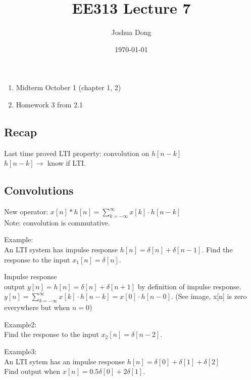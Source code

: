 \documentclass{article}
\begin{document}
\title{EE313\: Lecture 7}
\author{Joshua Dong}
\date{\today}
\maketitle

\begin{enumerate}
    \item{Midterm October 1 (chapter 1, 2)}
    \item{Homework 3 from 2.1}
\end{enumerate}

\subsection{Recap}
Last time proved LTI property: convolution on $h[n-k]$
\\$h[n-k] \rightarrow$ know if LTI.

\subsection{Convolutions}
New operator:
$x[n] * h[n] = \sum\limits_{k = -\infty}^\infty x[k] \cdot h[n-k]$
\\Note: convolution is commutative.
\begin{description}
    \item{Example:} \hfill \\
        An LTI system has impulse response
        $h[n] = \delta[n] + \delta[n-1]$.
        Find the response to the input $x_1[n] = \delta[n]$.
    \item{Impulse response} \hfill \\
        output $y[n] = h[n] = \delta[n] + \delta[n+1]$ by definition of
        impulse response.
        \\$y[n] = \sum\limits_{k = -\infty}^\infty x[k] \cdot h[n-k] =
        x[0] \cdot h[n-0]$.
        (See image, x[n] is zero everywhere but when $n=0$)
    \\ 
    \item{Example2:} \hfill \\
        Find the response to the input $x_2[n] = \delta[n-2]$.
    \\ 
    \item{Example3:} \hfill \\
        An LTI sytem has an impulse response
        $h[n] = \delta[0]+ \delta[1] + \delta[2]$
        \\Find output when 
        $x[n] = 0.5\delta[0]+ 2\delta[1]$.
    
\end{description}
\end{document}

